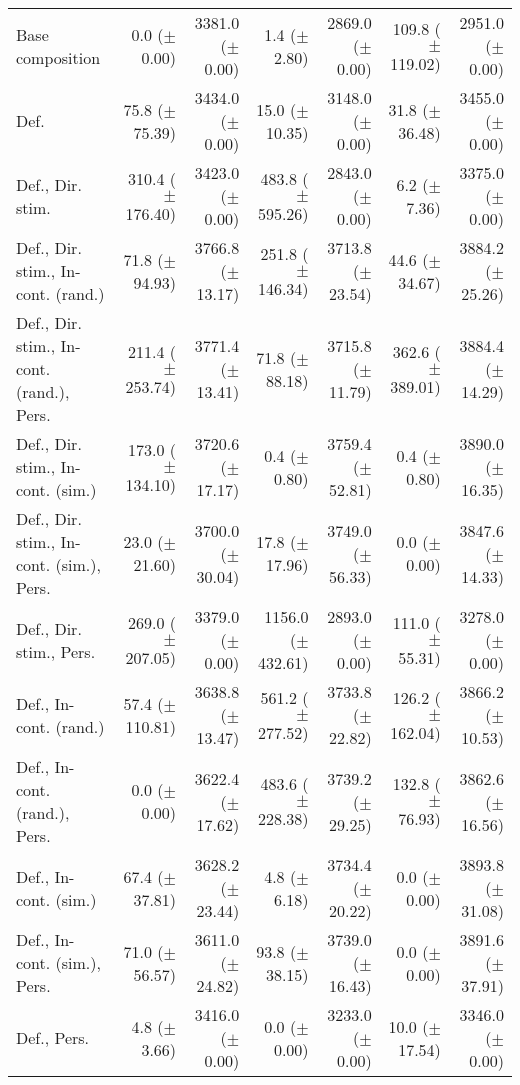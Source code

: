 \begin{table*}
\begin{tabular}{lrrrrrr}
        Base composition & 0.0 ($\pm$ 0.00) & 3381.0 ($\pm$ 0.00) & 1.4 ($\pm$ 2.80) & 2869.0 ($\pm$ 0.00) & 109.8 ($\pm$ 119.02) & 2951.0 ($\pm$ 0.00) \\
        Def. & 75.8 ($\pm$ 75.39) & 3434.0 ($\pm$ 0.00) & 15.0 ($\pm$ 10.35) & 3148.0 ($\pm$ 0.00) & 31.8 ($\pm$ 36.48) & 3455.0 ($\pm$ 0.00) \\
        Def., Dir. stim. & 310.4 ($\pm$ 176.40) & 3423.0 ($\pm$ 0.00) & 483.8 ($\pm$ 595.26) & 2843.0 ($\pm$ 0.00) & 6.2 ($\pm$ 7.36) & 3375.0 ($\pm$ 0.00) \\
        Def., Dir. stim., In-cont. (rand.) & 71.8 ($\pm$ 94.93) & 3766.8 ($\pm$ 13.17) & 251.8 ($\pm$ 146.34) & 3713.8 ($\pm$ 23.54) & 44.6 ($\pm$ 34.67) & 3884.2 ($\pm$ 25.26) \\
        Def., Dir. stim., In-cont. (rand.), Pers. & 211.4 ($\pm$ 253.74) & 3771.4 ($\pm$ 13.41) & 71.8 ($\pm$ 88.18) & 3715.8 ($\pm$ 11.79) & 362.6 ($\pm$ 389.01) & 3884.4 ($\pm$ 14.29) \\
        Def., Dir. stim., In-cont. (sim.) & 173.0 ($\pm$ 134.10) & 3720.6 ($\pm$ 17.17) & 0.4 ($\pm$ 0.80) & 3759.4 ($\pm$ 52.81) & 0.4 ($\pm$ 0.80) & 3890.0 ($\pm$ 16.35) \\
        Def., Dir. stim., In-cont. (sim.), Pers. & 23.0 ($\pm$ 21.60) & 3700.0 ($\pm$ 30.04) & 17.8 ($\pm$ 17.96) & 3749.0 ($\pm$ 56.33) & 0.0 ($\pm$ 0.00) & 3847.6 ($\pm$ 14.33) \\
        Def., Dir. stim., Pers. & 269.0 ($\pm$ 207.05) & 3379.0 ($\pm$ 0.00) & 1156.0 ($\pm$ 432.61) & 2893.0 ($\pm$ 0.00) & 111.0 ($\pm$ 55.31) & 3278.0 ($\pm$ 0.00) \\
        Def., In-cont. (rand.) & 57.4 ($\pm$ 110.81) & 3638.8 ($\pm$ 13.47) & 561.2 ($\pm$ 277.52) & 3733.8 ($\pm$ 22.82) & 126.2 ($\pm$ 162.04) & 3866.2 ($\pm$ 10.53) \\
        Def., In-cont. (rand.), Pers. & 0.0 ($\pm$ 0.00) & 3622.4 ($\pm$ 17.62) & 483.6 ($\pm$ 228.38) & 3739.2 ($\pm$ 29.25) & 132.8 ($\pm$ 76.93) & 3862.6 ($\pm$ 16.56) \\
        Def., In-cont. (sim.) & 67.4 ($\pm$ 37.81) & 3628.2 ($\pm$ 23.44) & 4.8 ($\pm$ 6.18) & 3734.4 ($\pm$ 20.22) & 0.0 ($\pm$ 0.00) & 3893.8 ($\pm$ 31.08) \\
        Def., In-cont. (sim.), Pers. & 71.0 ($\pm$ 56.57) & 3611.0 ($\pm$ 24.82) & 93.8 ($\pm$ 38.15) & 3739.0 ($\pm$ 16.43) & 0.0 ($\pm$ 0.00) & 3891.6 ($\pm$ 37.91) \\
        Def., Pers. & 4.8 ($\pm$ 3.66) & 3416.0 ($\pm$ 0.00) & 0.0 ($\pm$ 0.00) & 3233.0 ($\pm$ 0.00) & 10.0 ($\pm$ 17.54) & 3346.0 ($\pm$ 0.00) \\

\end{tabular}
\end{table*}
